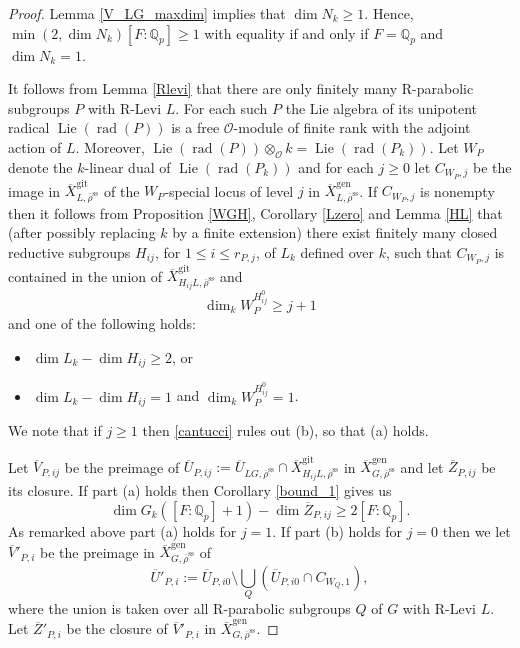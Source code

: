 \documentclass{amsart}
\theoremstyle{definition}
\theoremstyle{remark}
\DeclareMathOperator{\rad}{rad}
\newcommand{\Qp}{\mathbb {Q}_p}
\newcommand{\Zbar}{\overline{Z}}
\newcommand{\Vbar}{\overline{{V}}}
\newcommand{\OO}{\mathcal O}
\newcommand{\rhobar}{\overline{\rho}}
\newcommand{\gen}{\mathrm{gen}}
\newcommand{\gps}{\mathrm{git}}
\newcommand{\Xbar}{\overline{X}}
\DeclareMathOperator{\Lie}{Lie}
\newcommand{\rhobarss}{\rhobar^{\mathrm{ss}}}
\newcommand{\Ubar}{\overline{U}}
\begin{document}
\begin{proof} Lemma \ref{V_LG_maxdim} implies that $\dim N_k\ge 1$. Hence, $\min(2, \dim N_k)[F:\Qp]\ge 1$ with 
equality if and only if  $F=\Qp$ and $\dim N_k=1$.

It follows from Lemma \ref{Rlevi} that there are only finitely many R-parabolic subgroups 
$P$ with R-Levi $L$. For each such $P$ the Lie algebra of its unipotent radical $\Lie(\rad(P))$
is a free $\OO$-module of finite rank with the adjoint action of  $L$. Moreover, 
$\Lie(\rad(P))\otimes_{\OO} k = \Lie(\rad(P_k))$. Let $W_P$ denote the 
$k$-linear dual of $\Lie(\rad(P_k))$ and for each $j\ge 0$ let $C_{W_P, j}$ be the image in $\Xbar^{\gps}_{L, \rhobarss}$ of the 
$W_P$-special locus of level $j$ in $\Xbar^{\gen}_{L, \rhobarss}$. If $C_{W_P, j}$ is nonempty then it follows from Proposition \ref{WGH}, Corollary \ref{Lzero} and Lemma \ref{HL}
that (after possibly replacing $k$ by a finite extension) there exist finitely many closed reductive subgroups $H_{ij}$, for $1\le i \le r_{P,j}$, of $L_k$ defined over $k$, 
such that $C_{W_P, j}$ is contained in the union of $\Xbar^{\gps}_{H_{ij} L, \rhobarss}$ and
\begin{equation}\label{cantucci}
\dim_k W_P^{H^0_{ij}}\ge j+1
\end{equation} 
and one of the 
following holds:
\begin{itemize} 
\item[(a)] $\dim L_k -\dim H_{ij} \ge 2$, or
\item[(b)] $\dim L_k -\dim H_{ij}=1$ and $\dim_k W_P^{H^0_{ij}}=1$. 
\end{itemize} 
We note that if $j\ge 1$ then \eqref{cantucci} rules out (b), so that (a) holds. 

Let $\Vbar_{P,ij}$ be the preimage of $\Ubar_{P,ij}:=\Ubar_{LG, \rhobarss}\cap \Xbar^{\gps}_{H_{ij} L, \rhobarss}$  
in $\Xbar^{\gen}_{G, \rhobarss}$ and let $\Zbar_{P, ij}$ be its closure. If part  (a) holds then 
Corollary \ref{bound_1} gives us
\begin{equation}\label{eq_ij}
 \dim G_k ([F:\Qp]+1) - \dim \Zbar_{P,ij}\ge 2[F:\Qp].
\end{equation}
As remarked above part (a) holds for $j=1$. If part (b) holds for $j=0$ then 
we let $\Vbar'_{P,i}$ be the preimage in 
$\Xbar^{\gen}_{G, \rhobarss}$ of 
$$\Ubar'_{P,i}:= \Ubar_{P,i0} \setminus \bigcup_{Q} (\Ubar_{P,i0} \cap C_{W_Q, 1}),$$ 
where the union is taken over all R-parabolic subgroups $Q$ of $G$ with R-Levi $L$.
Let $\Zbar'_{P,i}$ be the closure of $\Vbar'_{P,i}$ in  $\Xbar^{\gen}_{G, \rhobarss}$.  


\end{proof}
\end{document}
